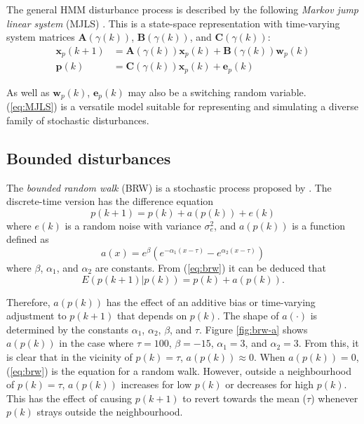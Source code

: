 The general HMM disturbance process is described by the following \textit{Markov jump linear system} (MJLS) \citep{costa_discrete-time_2005}. This is a state-space representation with time-varying system matrices $\mathbf{A}(\gamma(k))$, $\mathbf{B}(\gamma(k))$, and $\mathbf{C}(\gamma(k))$:
\begin{equation} \label{eq:MJLS}
	\begin{aligned}
	\mathbf{x}_p(k+1) &= \mathbf{A}(\gamma(k)) \mathbf{x}_p(k) + \mathbf{B}(\gamma(k))\mathbf{w}_p(k) \\
	\mathbf{p}(k) &= \mathbf{C}(\gamma(k)) \mathbf{x}_p(k) + \mathbf{e}_p(k)
	\end{aligned}
\end{equation}

As well as $\mathbf{w}_p(k)$, $\mathbf{e}_p(k)$ may also be a switching random variable. (\ref{eq:MJLS}) is a versatile model suitable for representing and simulating a diverse family of stochastic disturbances.

\subsection{Bounded disturbances}

The \textit{bounded random walk} (BRW) is a stochastic process proposed by \cite{nicolau_stationary_2002}. The discrete-time version has the difference equation
\begin{equation} \label{eq:brw}
		p(k+1) = p(k) + a(p(k)) + e(k)
\end{equation}
where $e(k)$ is a random noise with variance $\sigma_e^2$, and $a(p(k))$ is a function defined as
\begin{equation}
	a(x) = e^{\beta}\left(e^{-\alpha_{1}\left(x - \tau\right)} - e^{\alpha_{2}\left(x - \tau\right)}\right)
\end{equation}
where $\beta$, $\alpha_{1}$, and $\alpha_{2}$ are constants.  From (\ref{eq:brw}) it can be deduced that
\begin{equation}
	E(p(k+1)|p(k)) = p(k) + a(p(k)).
\end{equation}

Therefore, $a(p(k))$ has the effect of an additive bias or time-varying adjustment to $p(k+1)$ that depends on $p(k)$. The shape of $a(\cdot)$ is determined by the constants $\alpha_{1}$,  $\alpha_{2}$, $\beta$, and $\tau$. Figure \ref{fig:brw-a} shows $a(p(k))$ in the case where $\tau=100$, $\beta=-15$, $\alpha_{1}=3$, and $\alpha_{2}=3$.  From this, it is clear that in the vicinity of $p(k)=\tau$, $a(p(k))\approx0$. When $a(p(k))=0$, (\ref{eq:brw}) is the equation for a random walk. However, outside a neighbourhood of $p(k)=\tau$, $a(p(k))$ increases for low $p(k)$ or decreases for high $p(k)$. This has the effect of causing $p(k+1)$ to revert towards the mean ($\tau$) whenever $p(k)$ strays outside the neighbourhood. 

